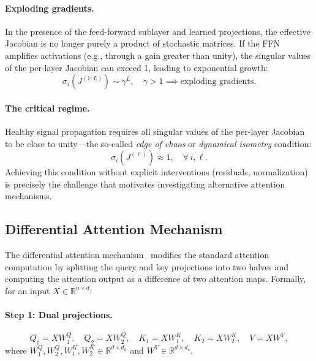 \documentclass[12pt, a4paper]{article}
\begin{document}
\paragraph{Exploding gradients.}
In the presence of the feed-forward sublayer and learned projections,
the effective Jacobian is no longer purely a product of stochastic
matrices. If the FFN amplifies activations (e.g., through a gain greater
than unity), the singular values of the per-layer Jacobian can exceed 1,
leading to exponential growth:
\begin{equation}
    \sigma_i\!\left(J^{(1:L)}\right) \sim \gamma^L, \quad \gamma > 1
    \implies \text{exploding gradients}.
    \label{eq:exploding}
\end{equation}

\paragraph{The critical regime.}
Healthy signal propagation requires all singular values of the per-layer
Jacobian to be close to unity---the so-called \textit{edge of chaos} or
\textit{dynamical isometry} condition:
\begin{equation}
    \sigma_i(J^{(\ell)}) \approx 1, \quad \forall\, i, \ell.
    \label{eq:isometry}
\end{equation}
Achieving this condition without explicit interventions (residuals, normalization) is precisely the challenge that motivates investigating alternative attention mechanisms.

\subsection{Differential Attention Mechanism}

The differential attention mechanism~\cite{diff_transformer} modifies the
standard attention computation by splitting the query and key projections
into two halves and computing the attention output as a difference of two
attention maps. Formally, for an input $X \in \mathbb{R}^{n \times d}$:

\paragraph{Step 1: Dual projections.}
\begin{equation}
    Q_1 = X W_1^Q, \quad Q_2 = X W_2^Q, \quad
    K_1 = X W_1^K, \quad K_2 = X W_2^K, \quad
    V = X W^V,
    \label{eq:diff_proj}
\end{equation}
where $W_1^Q, W_2^Q, W_1^K, W_2^K \in \mathbb{R}^{d \times d_k}$ and
$W^V \in \mathbb{R}^{d \times d_v}$.
\end{document}
